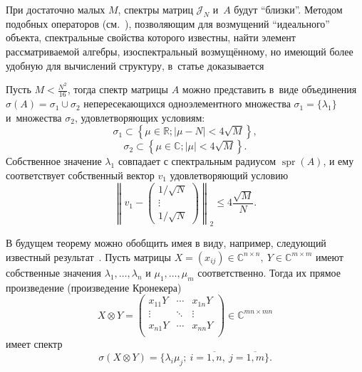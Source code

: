 При достаточно малых \( M \),
 спектры матриц \( \mathcal{J}_N \) и~\( A \) будут ``близки''.
Методом подобных операторов (см.~\cite{baskakov-harmonic,baskakov1983}),
 позволяющим для возмущений ``идеального'' объекта, спектральные свойства которого известны,
 найти элемент рассматриваемой алгебры, изоспектральный возмущ\"енному,
 но имеющий более удобную для вычислений структуру,
 в~статье доказывается
\begin{ksvthm}\label{kozlukovsv:thm:almost-all-ones}
    Пусть \( M < \frac{N^2}{16} \),
    тогда спектр матрицы \( A \) можно представить в~виде
    объединения \( \sigma\left(A\right) = \sigma_1 \cup \sigma_2 \)
    непересекающихся
    одноэлементного множества \( \sigma_1=\{\lambda_1\} \)
    и~множества \( \sigma_2 \), удовлетворяющих условиям:
    \[ \sigma_1 \subset \left\{ \mu\in\mathbb{R}; \lvert \mu - N \rvert < 4\sqrt{M} \right\}, \]
    \[ \sigma_2 \subset \left\{ \mu\in\mathbb{C}; \lvert \mu \rvert < 4\sqrt{M} \right\}. \]
    Собственное значение \( \lambda_1 \) совпадает с спектральным радиусом
    \( \operatorname{spr}(A) \),
    и ему соответствует собственный вектор \( v_1 \)
    удовлетворяющий условию
    \[ \left\|v_1 - 
    \begin{pmatrix} 1/\sqrt{N}\\ \vdots \\ 1/\sqrt{N}\end{pmatrix}\right\|_2
        \leq 4\frac{\sqrt{M}}{N}. \]
\end{ksvthm}

В будущем теорему можно обобщить имея в виду, например,
следующий известный результат~\cite{bellman-matrices-kron}.
Пусть матрицы \( X{=}(x_{ij})\in\mathbb{C}^{n\times n},\ Y\in\mathbb{C}^{m\times m} \)
имеют собственные значения
\( \lambda_1, \ldots, \lambda_n \)
и \( \mu_1, \ldots, \mu_m \) соответственно.
Тогда их прямое произведение (произведение Кронекера)
\[
    X\otimes Y =
    \begin{pmatrix}
        x_{11} Y & \cdots & x_{1n} Y \\
        \vdots & \ddots & \vdots \\
        x_{n1} Y & \cdots & x_{nn} Y \\
    \end{pmatrix}\in\mathbb{C}^{mn\times mn}
    \]
имеет спектр
\[
    \sigma(X\otimes Y) = \{ \lambda_i \mu _j;\ i=\overline{1,n},\ j=\overline{1,m} \}.
    \]
